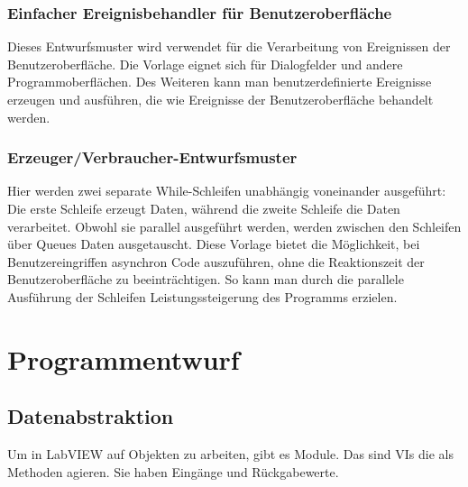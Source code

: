 \subsubsection{Einfacher Ereignisbehandler für Benutzeroberfläche}
Dieses Entwurfsmuster wird verwendet für die Verarbeitung von Ereignissen der Benutzeroberfläche. 
Die Vorlage eignet sich für Dialogfelder und andere Programmoberflächen. 
Des Weiteren kann man benutzerdefinierte Ereignisse erzeugen und ausführen, die wie Ereignisse der Benutzeroberfläche behandelt werden.

\subsubsection{Erzeuger/Verbraucher-Entwurfsmuster} %
Hier werden zwei separate While-Schleifen unabhängig voneinander ausgeführt: Die erste Schleife erzeugt Daten, während die zweite Schleife die Daten verarbeitet. 
Obwohl sie parallel ausgeführt werden, werden zwischen den Schleifen über Queues Daten ausgetauscht.
Diese Vorlage bietet die Möglichkeit, bei Benutzereingriffen asynchron Code auszuführen, ohne die Reaktionszeit der Benutzeroberfläche zu beeinträchtigen. 
So kann man durch die parallele Ausführung der Schleifen Leistungssteigerung des Programms erzielen. 

		
		
\section{Programmentwurf}
\subsection{Datenabstraktion}
Um in LabVIEW auf Objekten zu arbeiten, gibt es Module. Das sind VIs die als Methoden agieren. Sie haben Eingänge und Rückgabewerte.
